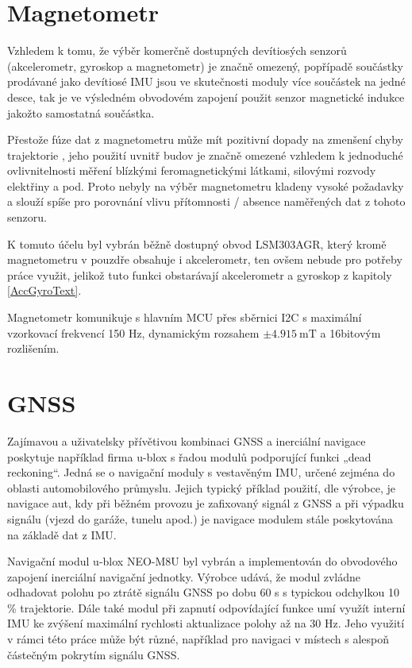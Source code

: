 \section{Magnetometr}
Vzhledem k tomu, že výběr komerčně dostupných devítiosých senzorů (akcelerometr, gyroskop a magnetometr) je značně omezený, popřípadě součástky prodávané jako devítiosé IMU jsou ve skutečnosti moduly více součástek na jedné desce, tak je ve výsledném obvodovém zapojení použit senzor magnetické indukce jakožto samostatná součástka. 

Přestože fúze dat z magnetometru může mít pozitivní dopady na zmenšení chyby trajektorie \cite{Tkhorenko2018}, jeho použití uvnitř budov je značně omezené vzhledem k jednoduché ovlivnitelnosti měření blízkými feromagnetickými látkami, silovými rozvody elektřiny a pod. Proto nebyly na výběr magnetometru kladeny vysoké požadavky a slouží spíše pro porovnání vlivu přítomnosti / absence naměřených dat z tohoto senzoru.

K tomuto účelu byl vybrán běžně dostupný obvod LSM303AGR, který kromě magnetometru v pouzdře obsahuje i akcelerometr, ten ovšem nebude pro potřeby práce využit, jelikož tuto funkci obstarávají akcelerometr a gyroskop z kapitoly \ref{AccGyroText}.

Magnetometr komunikuje s hlavním \ac{MCU} přes sběrnici \ac{I2C} s maximální vzorkovací frekvencí 150 Hz, dynamickým rozsahem $ \pm \SI{4.915}{\milli\tesla} $ a 16bitovým rozlišením. \cite{RD5DwZcremhT6bgp}

\section{GNSS}
Zajímavou a uživatelsky přívětivou kombinaci \ac{GNSS} a inerciální navigace poskytuje například firma u-blox s řadou modulů podporující funkci „dead reckoning“. Jedná se o navigační moduly s vestavěným \ac{IMU}, určené zejména do oblasti automobilového průmyslu. Jejich typický příklad použití, dle výrobce, je navigace aut, kdy při běžném provozu je zafixovaný signál z \ac{GNSS} a při výpadku signálu (vjezd do garáže, tunelu apod.) je navigace modulem stále poskytována na základě dat z \ac{IMU}. \cite{DLQg9bT6V1GWKhxh}

Navigační modul u-blox NEO-M8U byl vybrán a implementován do obvodového zapojení inerciální navigační jednotky.
Výrobce udává, že modul zvládne odhadovat polohu po ztrátě signálu \ac{GNSS} po dobu 60 s s typickou odchylkou 10 \% trajektorie. Dále také modul při zapnutí odpovídající funkce umí využít interní \ac{IMU} ke zvýšení maximální rychlosti aktualizace polohy až na 30 Hz. Jeho využití v rámci této práce může být různé, například pro navigaci v místech s alespoň částečným pokrytím signálu \ac{GNSS}. \cite{DLQg9bT6V1GWKhxh}

